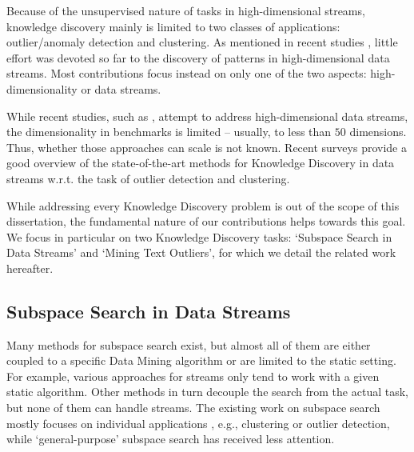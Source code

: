 Because of the unsupervised nature of tasks in high-dimensional streams, knowledge discovery mainly is limited to two classes of applications: outlier/anomaly detection and clustering. As mentioned in recent studies \cite{DBLP:conf/ssdbm/KriegelKNZ11,DBLP:conf/sdm/NtoutsiZPKK12}, little effort was devoted so far to the discovery of patterns in high-dimensional data streams. Most contributions focus instead on only one of the two aspects: high-dimensionality or data streams. 

While recent studies, such as \cite{DBLP:conf/vldb/AggarwalHWY04, DBLP:conf/icde/ZhangGW08, DBLP:conf/ssdbm/KriegelKNZ11, DBLP:conf/sdm/NtoutsiZPKK12}, attempt to address high-dimensional data streams, the dimensionality in benchmarks is limited -- usually, to less than $50$ dimensions. Thus, whether those approaches can scale is not known. Recent surveys \cite{DBLP:journals/tkde/GuptaGAH14, DBLP:journals/jcst/AminiTS14} provide a good overview of the state-of-the-art methods for Knowledge Discovery in data streams w.r.t. the task of outlier detection and clustering.

While addressing every Knowledge Discovery problem is out of the scope of this dissertation, the fundamental nature of our contributions helps towards this goal. We focus in particular on two Knowledge Discovery tasks: `Subspace Search in Data Streams' and `Mining Text Outliers', for which we detail the related work hereafter. 

\subsection{Subspace Search in Data Streams}

Many methods for subspace search exist, but almost all of them are either coupled to a specific Data Mining algorithm or are limited to the static setting. 
For example, various approaches for streams \cite{DBLP:conf/ideas/KontakiPM06, DBLP:conf/icdm/ZhangLW07, DBLP:conf/icde/ZhangGW08, DBLP:conf/icde/Aggarwal09a} %
only tend to work with a given static algorithm. Other methods in turn \cite{DBLP:conf/icde/KellerMB12, DBLP:conf/sdm/BohmKMNV13, DBLP:conf/bigdataconf/NguyenMB13, DBLP:conf/sdm/NguyenMV16, DBLP:conf/aaai/WangRNBMX17, DBLP:journals/ijdsa/TrittenbachB19} decouple the search from the actual task, but none of them can handle streams. The existing work on subspace search mostly focuses on individual applications \cite{DBLP:journals/sigkdd/ParsonsHL04, DBLP:journals/tkdd/KriegelKZ09, DBLP:journals/sadm/ZimekSK12}, e.g., clustering or outlier detection, while `general-purpose' subspace search has received less attention. 

